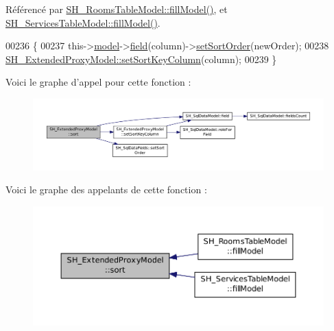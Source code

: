 Référencé par \hyperlink{classSH__RoomsTableModel_a5ac9fe2af0bda8002387546a0db01e1d}{S\-H\-\_\-\-Rooms\-Table\-Model\-::fill\-Model()}, et \hyperlink{classSH__ServicesTableModel_a2d18a3b167ded4e34a546e3f337c9c1a}{S\-H\-\_\-\-Services\-Table\-Model\-::fill\-Model()}.


\begin{DoxyCode}
00236 \{
00237     this->\hyperlink{classSH__ExtendedProxyModel_a8c8b8930c6b1abd9bbb1dce1fdc9690b}{model}->\hyperlink{classSH__SqlDataModel_a92c51d5c1f6aca08a7ee566ece1e4cb6}{field}(column)->\hyperlink{classSH__SqlDataFields_a32a7c040a081d39594245e1a4a68f70d}{setSortOrder}(newOrder);
00238     \hyperlink{classSH__ExtendedProxyModel_ab8123244a5060aa35f5bce651046b99d}{SH\_ExtendedProxyModel::setSortKeyColumn}(column);
00239 \}
\end{DoxyCode}


Voici le graphe d'appel pour cette fonction \-:\nopagebreak
\begin{figure}[H]
\begin{center}
\leavevmode
\includegraphics[width=350pt]{classSH__ExtendedProxyModel_a2d5fdb58bf67879e3f3130619b93104a_cgraph}
\end{center}
\end{figure}




Voici le graphe des appelants de cette fonction \-:\nopagebreak
\begin{figure}[H]
\begin{center}
\leavevmode
\includegraphics[width=350pt]{classSH__ExtendedProxyModel_a2d5fdb58bf67879e3f3130619b93104a_icgraph}
\end{center}
\end{figure}


